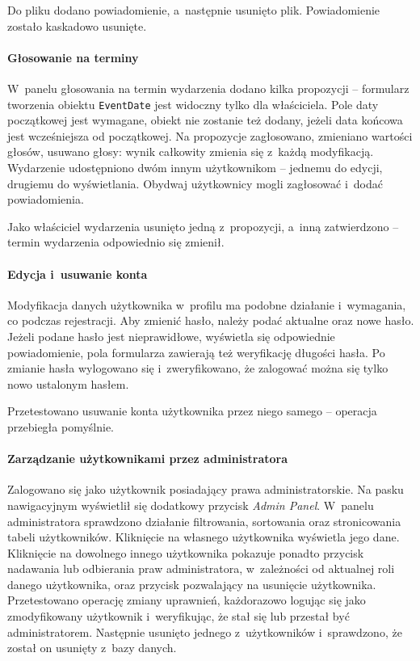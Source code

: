\documentclass[a4paper,twoside,12pt]{book}
\newcommand{\obcy}[1]{\emph{#1}}
\newcommand{\english}[1]{{\selectlanguage{british}\obcy{#1}}}
\begin{document}
Do pliku dodano powiadomienie, a~następnie usunięto plik. Powiadomienie zostało kaskadowo usunięte.

\paragraph{Głosowanie na terminy}
W~panelu głosowania na termin wydarzenia dodano kilka propozycji -- formularz tworzenia obiektu \texttt{EventDate} jest widoczny tylko dla właściciela. Pole daty początkowej jest wymagane, obiekt nie zostanie też dodany, jeżeli data końcowa jest wcześniejsza od początkowej. Na propozycje zagłosowano, zmieniano wartości głosów, usuwano głosy: wynik całkowity zmienia się z~każdą modyfikacją. Wydarzenie udostępniono dwóm innym użytkownikom -- jednemu do edycji, drugiemu do wyświetlania. Obydwaj użytkownicy mogli zagłosować i~dodać powiadomienia.

Jako właściciel wydarzenia usunięto jedną z~propozycji, a~inną zatwierdzono -- termin wydarzenia odpowiednio się zmienił.

\paragraph{Edycja i~usuwanie konta}
Modyfikacja danych użytkownika w~profilu ma podobne działanie i~wymagania, co podczas rejestracji. Aby zmienić hasło, należy podać aktualne oraz nowe hasło. Jeżeli podane hasło jest nieprawidłowe, wyświetla się odpowiednie powiadomienie, pola formularza zawierają też weryfikację długości hasła. Po zmianie hasła wylogowano się i~zweryfikowano, że zalogować można się tylko nowo ustalonym hasłem.

Przetestowano usuwanie konta użytkownika przez niego samego -- operacja przebiegła pomyślnie.

\paragraph{Zarządzanie użytkownikami przez administratora}
Zalogowano się jako użytkownik posiadający prawa administratorskie. Na pasku nawigacyjnym wyświetlił się dodatkowy przycisk \english{Admin Panel}. W~panelu administratora sprawdzono działanie filtrowania, sortowania oraz stronicowania tabeli użytkowników. Kliknięcie na własnego użytkownika wyświetla jego dane. Kliknięcie na dowolnego innego użytkownika pokazuje ponadto przycisk nadawania lub odbierania praw administratora, w~zależności od aktualnej roli danego użytkownika, oraz przycisk pozwalający na usunięcie użytkownika. Przetestowano operację zmiany uprawnień, każdorazowo logując się jako zmodyfikowany użytkownik i~weryfikując, że stał się lub przestał być administratorem. Następnie usunięto jednego z~użytkowników i~sprawdzono, że został on usunięty z~bazy danych.
\end{document}
